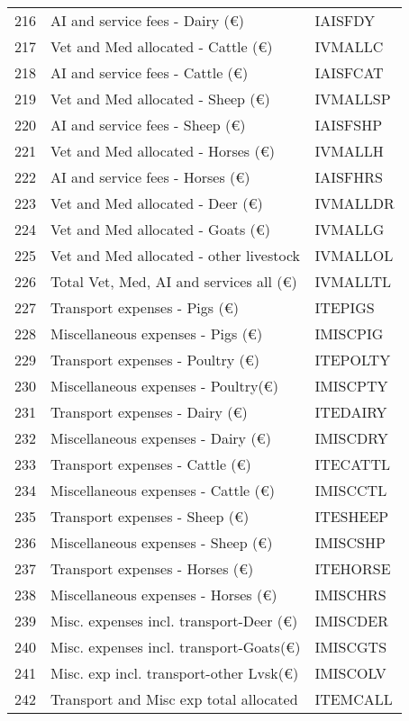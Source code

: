 \documentclass{article}\usepackage{graphicx, color}
\begin{document}
\begin{flushleft}
\begin{table}[ht]
\begin{center}
\begin{tabular}{rll}
  216 & AI and service fees - Dairy     (€) & IAISFDY \\ 
  217 & Vet and Med allocated - Cattle  (€) & IVMALLC \\ 
  218 & AI and service fees - Cattle    (€) & IAISFCAT \\ 
  219 & Vet and Med allocated - Sheep   (€) & IVMALLSP \\ 
  220 & AI and service fees - Sheep     (€) & IAISFSHP \\ 
  221 & Vet and Med allocated - Horses  (€) & IVMALLH \\ 
  222 & AI and service fees - Horses    (€) & IAISFHRS \\ 
  223 & Vet and Med allocated - Deer    (€) & IVMALLDR \\ 
  224 & Vet and Med allocated - Goats   (€) & IVMALLG \\ 
  225 & Vet and Med allocated - other livestock & IVMALLOL \\ 
  226 & Total Vet, Med, AI and services all (€) & IVMALLTL \\ 
  227 & Transport expenses - Pigs       (€) & ITEPIGS \\ 
  228 & Miscellaneous expenses - Pigs   (€) & IMISCPIG \\ 
  229 & Transport expenses - Poultry    (€) & ITEPOLTY \\ 
  230 & Miscellaneous expenses - Poultry(€) & IMISCPTY \\ 
  231 & Transport expenses - Dairy      (€) & ITEDAIRY \\ 
  232 & Miscellaneous expenses - Dairy  (€) & IMISCDRY \\ 
  233 & Transport expenses - Cattle     (€) & ITECATTL \\ 
  234 & Miscellaneous expenses - Cattle (€) & IMISCCTL \\ 
  235 & Transport expenses - Sheep      (€) & ITESHEEP \\ 
  236 & Miscellaneous expenses - Sheep  (€) & IMISCSHP \\ 
  237 & Transport expenses - Horses     (€) & ITEHORSE \\ 
  238 & Miscellaneous expenses - Horses (€) & IMISCHRS \\ 
  239 & Misc. expenses incl. transport-Deer (€) & IMISCDER \\ 
  240 & Misc. expenses incl. transport-Goats(€) & IMISCGTS \\ 
  241 & Misc. exp incl. transport-other Lvsk(€) & IMISCOLV \\ 
  242 & Transport and Misc exp total allocated & ITEMCALL \\ 

\end{tabular}
\end{center}
\end{table}
\end{flushleft}
\end{document}
